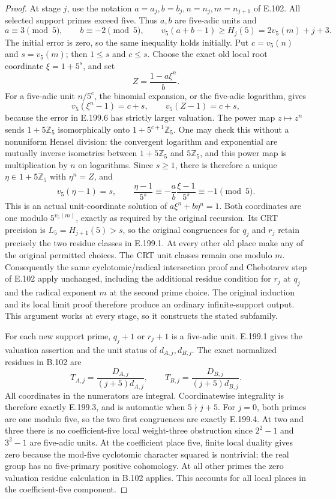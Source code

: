 \begin{proof}
At stage \(j\), use the notation \(a=a_j,b=b_j,n=n_j,m=n_{j+1}\)
of E.102.  All selected support primes exceed five.  Thus \(a,b\)
are five-adic units and
\[
 a\equiv3\pmod5,\qquad b\equiv-2\pmod5,\qquad
 v_5(a+b-1)\geq H_j(5)=2v_5(m)+j+3.
\tag{E.199.6}
\]
The initial error is zero, so the same inequality holds initially.
Put \(c=v_5(n)\) and \(s=v_5(m)\); then \(1\leq s\) and
\(c\leq s\).  Choose the exact old local root coordinate
\(\xi=1+5^s\), and set
\[
                   Z=\frac{1-a\xi^n}{b}.
\tag{E.199.7}
\]
For a five-adic unit \(n/5^c\), the binomial expansion, or the
five-adic logarithm, gives
\[
 v_5(\xi^n-1)=c+s,\qquad
 v_5(Z-1)=c+s,
\tag{E.199.8}
\]
because the error in E.199.6 has strictly larger valuation.
The power map \(z\mapsto z^n\) sends \(1+5\mathbb Z_5\)
isomorphically onto \(1+5^{c+1}\mathbb Z_5\).
One may check this without a nonuniform Hensel division: the convergent
logarithm and exponential are mutually inverse isometries between
\(1+5\mathbb Z_5\) and \(5\mathbb Z_5\), and this power map is
multiplication by \(n\) on logarithms.  Since \(s\geq1\), there is
therefore a unique \(\eta\in1+5\mathbb Z_5\) with
\(\eta^n=Z\), and
\[
 v_5(\eta-1)=s,\qquad
 \frac{\eta-1}{5^s}\equiv
       -\frac ab\frac{\xi-1}{5^s}\equiv-1\pmod5.
\tag{E.199.9}
\]
This is an actual unit-coordinate solution of
\(a\xi^n+b\eta^n=1\).  Both coordinates are one modulo
\(5^{v_5(m)}\), exactly as required by the original recursion.
Its CRT precision is \(L_5=H_{j+1}(5)>s\), so the original
congruences for \(q_j\) and \(r_j\) retain precisely the two
residue classes in E.199.1.  At every other old place make any of
the original permitted choices.  The CRT unit classes remain one
modulo \(m\).  Consequently the same cyclotomic/radical intersection
proof and Chebotarev step of E.102 apply unchanged, including the
additional residue condition for \(r_j\) at \(q_j\) and the
radical exponent \(m\) at the second prime choice.
The original induction and its local limit proof therefore produce
an ordinary infinite-support output.  This argument works at every
stage, so it constructs the stated subfamily.

For each new support prime, \(q_j+1\) or \(r_j+1\) is a five-adic
unit.  E.199.1 gives the valuation assertion and the unit status of
\(d_{A,j},d_{B,j}\).  The exact normalized residues in B.102 are
\[
 T_{A,j}=\frac{D_{A,j}}{(j+5)d_{A,j}},\qquad
 T_{B,j}=\frac{D_{B,j}}{(j+5)d_{B,j}}.
\tag{E.199.10}
\]
All coordinates in the numerators are integral.  Coordinatewise
integrality is therefore exactly E.199.3, and is automatic when
\(5\nmid j+5\).  For \(j=0\), both primes are one modulo five,
so the two first congruences are exactly E.199.4.  At two and three
there is no coefficient-five local weight-three obstruction since
\(2^2-1\) and \(3^2-1\) are five-adic units.  At the coefficient
place five, finite local duality gives zero because the mod-five
cyclotomic character squared is nontrivial; the real group has no
five-primary positive cohomology.  At all other primes the zero
valuation residue calculation in B.102 applies.  This accounts for
all local places in the coefficient-five component.


\end{proof}
